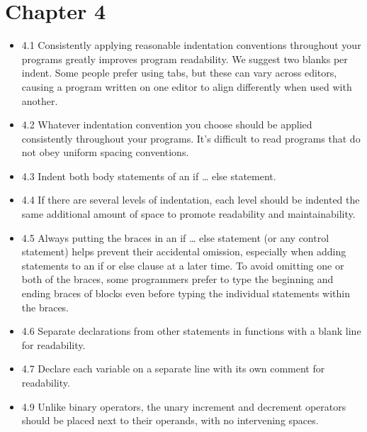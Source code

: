 \documentclass[11pt]{article}
\begin{document}
\section{Chapter 4}
\label{sec-4}
\begin{itemize}
\item 4.1 Consistently applying reasonable indentation conventions
throughout your programs greatly improves program readability. We
suggest two blanks per indent. Some people prefer using tabs, but
these can vary across editors, causing a program written on one
editor to align differently when used with another.
\item 4.2 Whatever indentation convention you choose should be applied
consistently throughout your programs. It’s difficult to read
programs that do not obey uniform spacing conventions.
\item 4.3 Indent both body statements of an if \ldots{} else statement.
\item 4.4 If there are several levels of indentation, each level should be
indented the same additional amount of space to promote readability
and maintainability.
\item 4.5 Always putting the braces in an if \ldots{} else statement (or any
control statement) helps prevent their accidental omission,
especially when adding statements to an if or else clause at a later
time. To avoid omitting one or both of the braces, some programmers
prefer to type the beginning and ending braces of blocks even before
typing the individual statements within the braces.
\item 4.6 Separate declarations from other statements in functions with a
blank line for readability.
\item 4.7 Declare each variable on a separate line with its own comment
for readability.
\item 4.9 Unlike binary operators, the unary increment and decrement
operators should be placed next to their operands, with no
intervening spaces.
\end{itemize}
\end{document}
